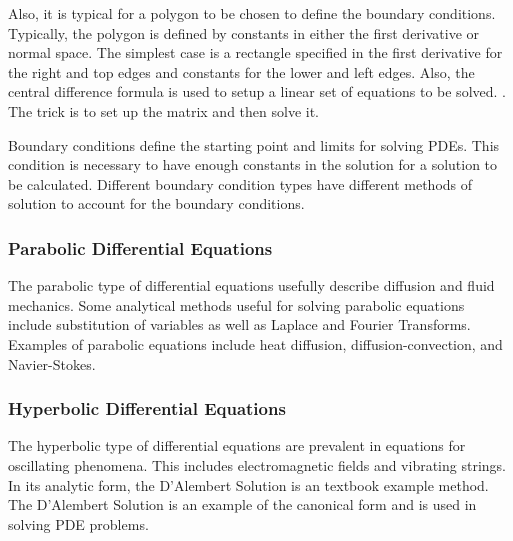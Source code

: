Also, it is typical for a polygon to be chosen to define the boundary conditions.   Typically, the polygon is defined by constants in either the first derivative or normal space.  %
The simplest case is a rectangle specified in the first derivative for the right and top edges and constants for the lower and left edges.  Also, the central difference formula is used to setup a linear set of equations to be solved.  \cite{appliedmethods}.  The trick is to set up the matrix and then solve it. %


Boundary conditions define the starting point and limits for solving PDEs.  This condition is necessary to have enough constants in the solution for a solution to be calculated.  Different boundary condition types have different methods of solution to account for the boundary conditions.  

\subsubsection {Parabolic Differential Equations}
The parabolic type of differential equations usefully describe diffusion and fluid mechanics.  Some analytical methods useful for solving parabolic equations include substitution of variables as well as Laplace and Fourier Transforms.  Examples of parabolic equations include heat diffusion, diffusion-convection, and Navier-Stokes.  


\subsubsection {Hyperbolic Differential Equations}
The hyperbolic type of differential equations are prevalent in equations for oscillating phenomena.  This includes electromagnetic fields and vibrating strings.   In its analytic %
form, the D'Alembert Solution is an textbook example method.  The D'Alembert Solution is an example of the canonical form and is used in solving PDE problems.  

